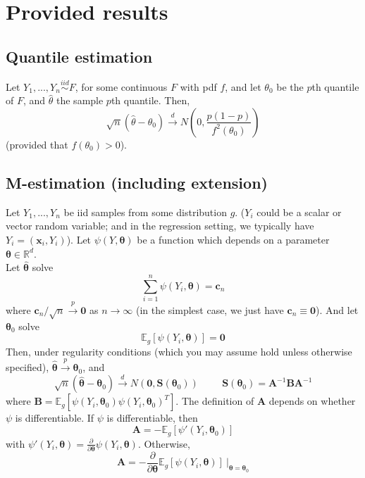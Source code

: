 \documentclass[11pt]{article}
\begin{document}
\newpage

\section*{Provided results}

\subsection*{Quantile estimation}

Let $Y_1,...,Y_n \overset{iid}{\sim} F$, for some continuous $F$ with pdf $f$, and let $\theta_0$ be the $p$th quantile of $F$, and $\widehat{\theta}$ the sample $p$th quantile. Then,
$$\sqrt{n}(\widehat{\theta} - \theta_0) \overset{d}{\to} N\left(0, \frac{p(1-p)}{f^2(\theta_0)} \right)$$
(provided that $f(\theta_0) > 0$).

\subsection*{M-estimation (including extension)}

Let $Y_1,...,Y_n$ be iid samples from some distribution $g$. ($Y_i$ could be a scalar or vector random variable; and in the regression setting, we typically have $Y_i = (\mathbf{x}_i, Y_i)$). Let $\psi(Y, \boldsymbol{\theta})$ be a function which depends on a parameter $\boldsymbol{\theta} \in \mathbb{R}^d$.\\

\noindent Let $\widehat{\boldsymbol{\theta}}$ solve
$$\sum \limits_{i=1}^n \psi(Y_i, \boldsymbol{\theta}) = \boldsymbol{c}_n$$
where $\boldsymbol{c}_n/\sqrt{n} \overset{p}{\to} \boldsymbol{0}$ as $n \to \infty$ (in the simplest case, we just have $\boldsymbol{c}_n \equiv \boldsymbol{0}$). And let $\boldsymbol{\theta}_0$ solve
$$\mathbb{E}_g[\psi(Y_i, \boldsymbol{\theta})] = \boldsymbol{0}$$
Then, under regularity conditions (which you may assume hold unless otherwise specified), $\widehat{\boldsymbol{\theta}} \overset{p}{\to} \boldsymbol{\theta}_0$, and
$$\sqrt{n}(\widehat{\boldsymbol{\theta}} - \boldsymbol{\theta}_0) \overset{d}{\to} N(\boldsymbol{0}, \mathbf{S}(\boldsymbol{\theta}_0)) \hspace{1cm} \mathbf{S}(\boldsymbol{\theta}_0) = \mathbf{A}^{-1} \mathbf{B} \mathbf{A}^{-1}$$
where $\mathbf{B} = \mathbb{E}_g[\psi(Y_i, \boldsymbol{\theta}_0) \psi(Y_i, \boldsymbol{\theta}_0)^T]$. The definition of $\mathbf{A}$ depends on whether $\psi$ is differentiable. If $\psi$ is differentiable, then
$$\mathbf{A} = -\mathbb{E}_g\left[ \psi'(Y_i, \boldsymbol{\theta}_0) \right]$$
with $\psi'(Y_i, \boldsymbol{\theta}) = \frac{\partial}{\partial \boldsymbol{\theta}} \psi(Y_i, \boldsymbol{\theta})$. Otherwise,
$$\mathbf{A} = -\frac{\partial}{\partial \boldsymbol{\theta}} \mathbb{E}_g[\psi(Y_i, \boldsymbol{\theta})] \ \Biggr\lvert_{\boldsymbol{\theta} = \boldsymbol{\theta}_0}$$
\end{document}
